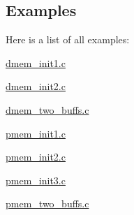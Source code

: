 \subsection{Examples}
Here is a list of all examples\-:\begin{DoxyCompactItemize}
\item 
\hyperlink{dmem_init1_8c-example}{dmem\-\_\-init1.\-c}
\item 
\hyperlink{dmem_init2_8c-example}{dmem\-\_\-init2.\-c}
\item 
\hyperlink{dmem_two_buffs_8c-example}{dmem\-\_\-two\-\_\-buffs.\-c}
\item 
\hyperlink{pmem_init1_8c-example}{pmem\-\_\-init1.\-c}
\item 
\hyperlink{pmem_init2_8c-example}{pmem\-\_\-init2.\-c}
\item 
\hyperlink{pmem_init3_8c-example}{pmem\-\_\-init3.\-c}
\item 
\hyperlink{pmem_two_buffs_8c-example}{pmem\-\_\-two\-\_\-buffs.\-c}
\end{DoxyCompactItemize}
